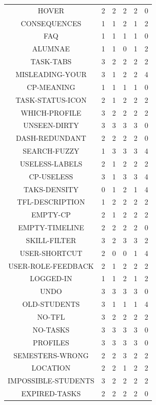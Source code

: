 \documentclass[
  12pt,
  ngerman,
  a4paper,
]{article}
\begin{document}
\begin{longtable}[]{@{}cccccc@{}}
HOVER & 2 & 2 & 2 & 2 & 0\tabularnewline
CONSEQUENCES & 1 & 1 & 2 & 1 & 2\tabularnewline
FAQ & 1 & 1 & 1 & 1 & 0\tabularnewline
ALUMNAE & 1 & 1 & 0 & 1 & 2\tabularnewline
TASK-TABS & 3 & 2 & 2 & 2 & 2\tabularnewline
MISLEADING-YOUR & 3 & 1 & 2 & 2 & 4\tabularnewline
CP-MEANING & 1 & 1 & 1 & 1 & 0\tabularnewline
TASK-STATUS-ICON & 2 & 1 & 2 & 2 & 2\tabularnewline
WHICH-PROFILE & 3 & 2 & 2 & 2 & 2\tabularnewline
UNSEEN-DIRTY & 3 & 3 & 3 & 3 & 0\tabularnewline
DASH-REDUNDANT & 2 & 2 & 2 & 2 & 0\tabularnewline
SEARCH-FUZZY & 1 & 3 & 3 & 3 & 4\tabularnewline
USELESS-LABELS & 2 & 1 & 2 & 2 & 2\tabularnewline
CP-USELESS & 3 & 1 & 3 & 3 & 4\tabularnewline
TAKS-DENSITY & 0 & 1 & 2 & 1 & 4\tabularnewline
TFL-DESCRIPTION & 1 & 2 & 2 & 2 & 2\tabularnewline
EMPTY-CP & 2 & 1 & 2 & 2 & 2\tabularnewline
EMPTY-TIMELINE & 2 & 2 & 2 & 2 & 0\tabularnewline
SKILL-FILTER & 3 & 2 & 3 & 3 & 2\tabularnewline
USER-SHORTCUT & 2 & 0 & 0 & 1 & 4\tabularnewline
USER-ROLE-FEEDBACK & 2 & 1 & 2 & 2 & 2\tabularnewline
LOGGED-IN & 1 & 1 & 2 & 1 & 2\tabularnewline
UNDO & 3 & 3 & 3 & 3 & 0\tabularnewline
OLD-STUDENTS & 3 & 1 & 1 & 1 & 4\tabularnewline
NO-TFL & 3 & 2 & 2 & 2 & 2\tabularnewline
NO-TASKS & 3 & 3 & 3 & 3 & 0\tabularnewline
PROFILES & 3 & 3 & 3 & 3 & 0\tabularnewline
SEMESTERS-WRONG & 2 & 2 & 3 & 2 & 2\tabularnewline
LOCATION & 2 & 2 & 1 & 2 & 2\tabularnewline
IMPOSSIBLE-STUDENTS & 3 & 2 & 2 & 2 & 2\tabularnewline
EXPIRED-TASKS & 2 & 2 & 2 & 2 & 0\tabularnewline
\bottomrule
\end{longtable}

  


\printnoidxglossary[sort=word]
\end{document}
